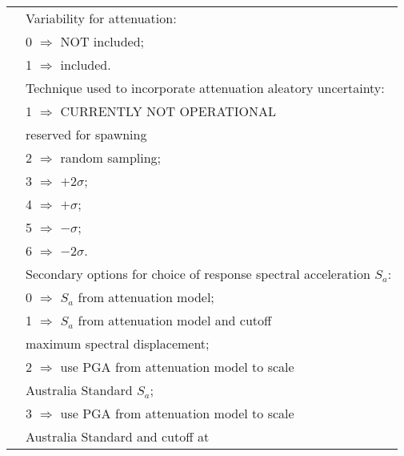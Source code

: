 \documentclass[a4paper, 12pt]{report}
\begin{document}
\begin{supertabular}{lp{0.6\textwidth}}
   &  Variability for attenuation: \\
 & \hspace{0.5em} 0 $\Rightarrow$ NOT included; \\
  & \hspace{0.5em}  1 $\Rightarrow$ included.   \\
 & Technique used to
incorporate attenuation aleatory uncertainty: \\
 & \hspace{0.5em} 1 $\Rightarrow$ \small{\small{CURRENTLY NOT OPERATIONAL}} \\
 & \hspace{0.5em} reserved for spawning \\
 & \hspace{0.5em} 2 $\Rightarrow$ random sampling; \\
 & \hspace{0.5em} 3 $\Rightarrow$ $+2\sigma$; \\
 & \hspace{0.5em} 4 $\Rightarrow$ $+\sigma$; \\
 & \hspace{0.5em} 5 $\Rightarrow$ $-\sigma$; \\
 & \hspace{0.5em} 6 $\Rightarrow$ $-2\sigma$.\\
 & Secondary options for choice of
response spectral acceleration $S_a$: \\
 & \hspace{0.5em} 0 $\Rightarrow$ $S_a$ from attenuation model; \\
 & \hspace{0.5em} 1 $\Rightarrow$ $S_a$ from attenuation model and cutoff\\
 & \hspace{2.8em} maximum spectral displacement; \\
 & \hspace{0.5em} 2 $\Rightarrow$ use PGA from attenuation model to scale\\
 & \hspace{2.8em} Australia Standard $S_a$; \\
 & \hspace{0.5em} 3 $\Rightarrow$ use PGA from attenuation model to scale \\
 & \hspace{2.8em} Australia Standard and cutoff at \\

\end{supertabular}
\end{document}
